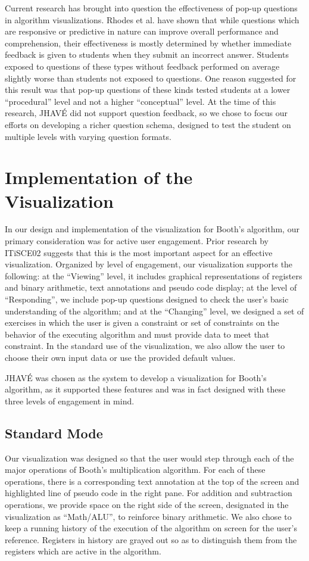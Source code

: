 \documentclass{acm_proc_article-sp}
\begin{document}
Current research has brought into question the effectiveness of pop-up questions in algorithm visualizations.
Rhodes et al.
have shown that while questions which are responsive or predictive in nature can improve overall performance and comprehension, their effectiveness is mostly determined by whether immediate feedback is given to students when they submit an incorrect answer.
Students exposed to questions of these types without feedback performed on average slightly worse than students not exposed to questions.
One reason suggested for this result was that pop-up questions of these kinds tested students at a lower ``procedural'' level and not a higher ``conceptual'' level.\cite{intquest}
At the time of this research, JHAVÉ did not support question feedback, so we chose to focus our efforts on developing a richer question schema, designed to test the student on multiple levels with varying question formats.

\section{Implementation of the Visualization}
In our design and implementation of the visualization for Booth's algorithm, our primary consideration was for active user engagement.
Prior research by ITiSCE02 suggests that this is the most important aspect for an effective visualization.\cite{tnaps:visengage}
Organized by level of engagement, our visualization supports the following: at the ``Viewing'' level, it includes graphical representations of registers and binary arithmetic, text annotations and pseudo code
 display; at the level of ``Responding'', we include pop-up questions designed to check the user's basic understanding of the algorithm; and at the ``Changing'' level, we designed a set of exercises in which the user is given a constraint or set of constraints on the behavior of the executing algorithm and must provide data to meet that constraint.
In the standard use of the visualization, we also allow the user to choose their own input data or use the provided default values.

JHAVÉ was chosen as the system to develop a visualization for Booth's algorithm, as it supported these features and was in fact designed with these three levels of engagement in mind.\cite{JHAVE}

\subsection{Standard Mode}
Our visualization was designed so that the user would step through each of the major operations of Booth's multiplication algorithm.
For each of these operations, there is a corresponding text annotation at the top of the screen and highlighted line of pseudo code in the right pane.
For addition and subtraction operations, we provide space on the right side of the screen, designated in the visualization as ``Math/ALU'', to reinforce binary arithmetic.
We also chose to keep a running history of the execution of the algorithm on screen for the user's reference.
Registers in history are grayed out so as to distinguish them from the registers which are active in the algorithm.
\end{document}
